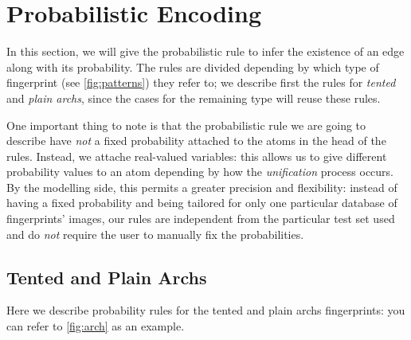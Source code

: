 \documentclass[8pt]{article}
\begin{document}
\section{Probabilistic Encoding}
\label{sec:probenc}
In this section, we will give the probabilistic rule to infer the existence of
an edge along with its probability. The rules are divided depending by which
type of fingerprint (see \cref{fig:patterns}) they refer to; we describe first
the rules for \emph{tented} and \emph{plain archs}, since the cases for the
remaining type will reuse these rules.

One important thing to note is that the probabilistic rule we are going to
describe have \emph{not} a fixed probability attached to the atoms in the head
of the rules. Instead, we attache real-valued variables: this allows us to give
different probability values to an atom depending by how the \emph{unification}
process occurs. By the modelling side, this permits a greater precision and
flexibility: instead of having a fixed probability and being tailored for only
one particular database of fingerprints' images, our rules are independent from
the particular test set used and do \emph{not} require the user to manually fix
the probabilities.



\subsection{Tented and Plain Archs}
Here we describe probability rules for the tented and plain archs fingerprints:
you can refer to \cref{fig:arch} as an example.
\end{document}
